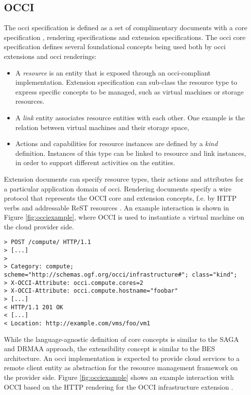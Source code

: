\documentclass[twocolumn]{svjour3}       %
\begin{document}
\subsection{OCCI}

The \gls{occi} specification is defined as a set of complimentary documents with a core specification \cite{citemaster_9270}, rendering specifications and extension specifications. The \gls{occi} core specification defines several foundational concepts being used both by \gls{occi} extensions and \gls{occi} renderings:

\begin{itemize}
\item A \emph{resource} is an entity that is exposed through an \gls{occi}-compliant implementation. Extension specification can sub-class the resource type to express specific concepts to be managed, such as virtual machines or storage resources.
\item A \emph{link} entity associates resource entities with each other. One example is the relation between virtual machines and their storage space,
\item Actions and capabilities for resource instances are defined by a \emph{kind} definition. Instances of this type can be linked to resource and link instances, in order to support different activities on the entities.
\end{itemize}

Extension documents can specify resource types, their actions and attributes for a particular application domain of \gls{occi}. Rendering documents specify a wire protocol that represents the OCCI core and extension concepts, f.e. by HTTP verbs and addressable ReST resources \cite{gfd185}. An example interaction is shown in Figure \ref{fig:occiexample}, where OCCI is used to instantiate a virtual machine on the cloud provider side.

\begin{figure*}
\begin{lstlisting}
> POST /compute/ HTTP/1.1 
> [...] 
> 
> Category: compute; scheme="http://schemas.ogf.org/occi/infrastructure#"; class="kind"; 
> X-OCCI-Attribute: occi.compute.cores=2
> X-OCCI-Attribute: occi.compute.hostname="foobar" 
> [...]
< HTTP/1.1 201 OK 
< [...] 
< Location: http://example.com/vms/foo/vm1
\end{lstlisting}
\caption{Example: Creating a virtual machine instance}
\label{fig:occiexample} 
\end{figure*}


While the language-agnostic definition of core concepts is similar to the SAGA and DRMAA approach, the extensibility concept is similar to the BES architecture. An \gls{occi} implementation is expected to provide cloud services to a remote client entity as abstraction for the resource management framework on the provider side. Figure \ref{fig:occiexample} shows an example interaction with OCCI based on the HTTP rendering for the OCCI infrastructure extension \cite{citemaster_9271}.
\end{document}
